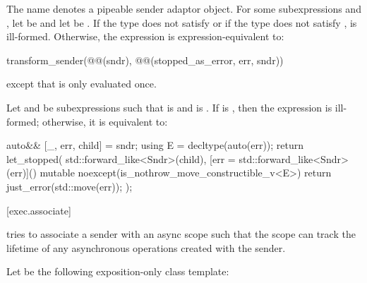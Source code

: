 \pnum
The name  denotes a pipeable sender adaptor object.
For some subexpressions  and ,
let  be  and
let  be .
If the type  does not satisfy  or
if the type  does not satisfy ,
 is ill-formed.
Otherwise, the expression 
is expression-equivalent to:
\begin{codeblock}
transform_sender(@@(sndr), @@(stopped_as_error, err, sndr))
\end{codeblock}
except that  is only evaluated once.

\pnum
Let  and  be subexpressions
such that  is  and
 is .
If  is ,
then the expression 
is ill-formed;
otherwise, it is equivalent to:
\begin{codeblock}
auto&& [_, err, child] = sndr;
using E = decltype(auto(err));
return let_stopped(
  std::forward_like<Sndr>(child),
  [err = std::forward_like<Sndr>(err)]() mutable noexcept(is_nothrow_move_constructible_v<E>) {
    return just_error(std::move(err));
  });
\end{codeblock}

[exec.associate]{}

\pnum
{} tries to associate
a sender with an async scope such that
the scope can track the lifetime of any asynchronous operations
created with the sender.

\pnum
Let  be the following exposition-only class template:

